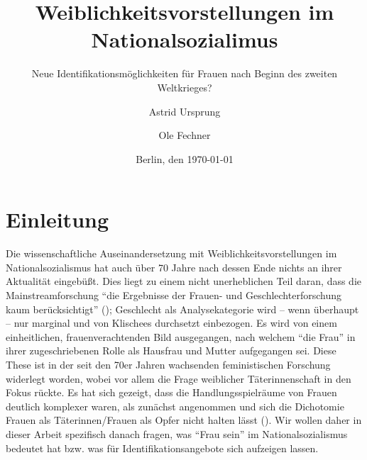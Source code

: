 \documentclass[12pt, titlepage=true, toc=bib]{scrartcl}
\begin{document}
\titlehead{Freie Universität Berlin\\
			FB Politik- und Sozialwissenschaften\\
			Otto-Suhr-Institut\\
			Sommersemester 2016\\
			{[}GEND{]} Rechtsextremismus und Gender: Geschichte und Gegenwart (15095)\\
			Carmen Altmeyer, Till Herold}
\author{Astrid Ursprung\and Ole Fechner}
\title{Weiblichkeitsvorstellungen im Nationalsozialimus}
\subtitle{Neue Identifikationsmöglichkeiten für Frauen nach Beginn des zweiten Weltkrieges?}
\date{\normalsize{Berlin, den \today}}

\publishers{\normalsize{Goltzstr. 16\hfill Gerichtstr. 13\\
							 10781 Berlin\hfill 13347 Berlin\\
							 ursprung@posteo.de\hfill ole.fechner@fu-berlin.de\\
							 Matrikelnummer: 4768210\hfill Matrikelnummer: 4757766\\
							 BA Politikwissenschaft\hfill BA Politikwissenschaft}}


\maketitle[0]

\newpage
\thispagestyle{empty}
\tableofcontents

\newpage
\setcounter{page}{1}

\section{Einleitung}

Die wissenschaftliche Auseinandersetzung mit Weiblichkeitsvorstellungen im Nationalsozialismus hat auch über 70 Jahre nach dessen Ende nichts an ihrer Aktualität eingebüßt. Dies liegt zu einem nicht unerheblichen Teil daran, dass die Mainstreamforschung "`die Ergebnisse der Frauen- und Geschlechterforschung kaum berücksichtigt"' (\cite[9]{frietsch_nationalsozialismus_2015}); Geschlecht als Analysekategorie wird -- wenn überhaupt -- nur marginal und von Klischees durchsetzt einbezogen. Es wird von einem einheitlichen, frauenverachtenden Bild ausgegangen, nach welchem "`die Frau"' in ihrer zugeschriebenen Rolle als Hausfrau und Mutter aufgegangen sei. Diese These ist in der seit den 70er Jahren wachsenden feministischen Forschung widerlegt worden, wobei vor allem die Frage weiblicher Täterinnenschaft in den Fokus rückte. Es hat sich gezeigt, dass die Handlungsspielräume von Frauen deutlich komplexer waren, als zunächst angenommen und sich die Dichotomie Frauen als Täterinnen/Frauen als Opfer nicht halten lässt (\cite[10-11]{frietsch_nationalsozialismus_2015}). Wir wollen daher in dieser Arbeit spezifisch danach fragen, was "`Frau sein"' im Nationalsozialismus bedeutet hat bzw. was für Identifikationsangebote sich aufzeigen lassen.
\end{document}
